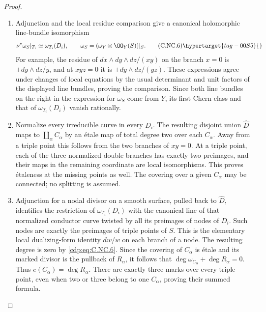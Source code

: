\begin{proof}

\begin{enumerate}[label={$\langle1\rangle$\arabic*.},leftmargin=*]
\item Adjunction and the local residue comparison give a canonical holomorphic line-bundle isomorphism
\[
 \nu^*\omega_S|_{T_i}\simeq\omega_{T_i}(D_i),
 \qquad \omega_S=(\omega_Y\otimes\OO_Y(S))|_S.
 \tag{C.NC.6}\hypertarget{tag-00S5}{}\label{cdp:eq:C.NC.6}
\]
For example, the residue of $dx\wedge dy\wedge dz/(xy)$ on the branch $x=0$ is $\pm dy\wedge dz/y$, and at $xyz=0$ it is $\pm dy\wedge dz/(yz)$. These expressions agree under changes of local equations by the usual determinant and unit factors of the displayed line bundles, proving the comparison. Since both line bundles on the right in the expression for $\omega_S$ come from $Y$, its first Chern class and that of $\omega_{T_i}(D_i)$ vanish rationally.

\item Normalize every irreducible curve in every $D_i$. The resulting disjoint union $\widehat D$ maps to $\coprod_\alpha C_\alpha$ by an étale map of total degree two over each $C_\alpha$. Away from a triple point this follows from the two branches of $xy=0$. At a triple point, each of the three normalized double branches has exactly two preimages, and their maps in the remaining coordinate are local isomorphisms. This proves étaleness at the missing points as well. The covering over a given $C_\alpha$ may be connected; no splitting is assumed.

\item Adjunction for a nodal divisor on a smooth surface, pulled back to $\widehat D$, identifies the restriction of $\omega_{T_i}(D_i)$ with the canonical line of that normalized conductor curve twisted by all its preimages of nodes of $D_i$. Such nodes are exactly the preimages of triple points of $S$. This is the elementary local dualizing-form identity $dw/w$ on each branch of a node. The resulting degree is zero by \eqref{cdp:eq:C.NC.6}. Since the covering of $C_\alpha$ is étale and its marked divisor is the pullback of $R_\alpha$, it follows that
$\deg\omega_{C_\alpha}+\deg R_\alpha=0$.
Thus $e(C_\alpha)=\deg R_\alpha$. There are exactly three marks over every triple point, even when two or three belong to one $C_\alpha$, proving their summed formula.


\end{enumerate}
\end{proof}
